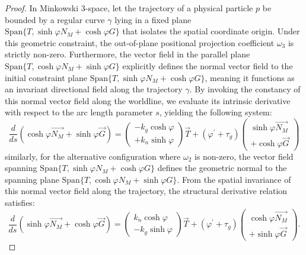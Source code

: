 \documentclass[10pt,a4paper]{amsart}
\begin{document}
\begin{proof}
In Minkowski 3-space, let the trajectory of a physical particle $p$ be bounded by a regular curve $\gamma$ lying in a fixed plane $\text{Span}\{T, \sinh \varphi N_{M} + \cosh \varphi G\}$ that isolates the spatial coordinate origin. Under this geometric constraint, the out-of-plane positional projection coefficient $\omega_{3}$ is strictly non-zero. Furthermore, the vector field in the parallel plane $\text{Span}\{T, \cosh \varphi N_{M} + \sinh \varphi G\}$ explicitly defines the normal vector field to the initial constraint plane $\text{Span}\{T, \sinh \varphi N_{M} + \cosh \varphi G\}$, meaning it functions as an invariant directional field along the trajectory $\gamma$. By invoking the constancy of this normal vector field along the worldline, we evaluate its intrinsic derivative with respect to the arc length parameter $s$, yielding the following system:
\begin{equation}
\frac{d}{ds}\left( \cosh \varphi \overrightarrow{N_{M}}+\sinh \varphi 
\overrightarrow{G}\right) =\left( 
\begin{array}{c}
-k_{g}\cosh \varphi \\ 
+k_{n}\sinh \varphi%
\end{array}%
\right) \overrightarrow{T}+(\varphi ^{\prime }+\tau _{g})\left( 
\begin{array}{c}
\sinh \varphi \overrightarrow{N_{M}} \\ 
+\cosh \varphi \overrightarrow{G}%
\end{array}%
\right)  \tag{3.18}
\end{equation}%
similarly, for the alternative configuration where $\omega_{2}$ is non-zero, the vector field spanning $\text{Span}\{T, \sinh \varphi N_{M} + \cosh \varphi G\}$ defines the geometric normal to the spanning plane $\text{Span}\{T, \cosh \varphi N_{M} + \sinh \varphi G\}$. From the spatial invariance of this normal vector field along the trajectory, the structural derivative relation satisfies:
\begin{equation}
\frac{d}{ds}\left( \sinh \varphi \overrightarrow{N_{M}}+\cosh \varphi 
\overrightarrow{G}\right) =\left( 
\begin{array}{c}
k_{n}\cosh \varphi \\ 
-k_{g}\sinh \varphi%
\end{array}%
\right) \overrightarrow{T}+(\varphi ^{\prime }+\tau _{g})\left( 
\begin{array}{c}
\cosh \varphi \overrightarrow{N_{M}} \\ 
+\sinh \varphi \overrightarrow{G}%
\end{array}%
\right) .  \tag{3.19}
\end{equation}


\end{proof}
\end{document}
